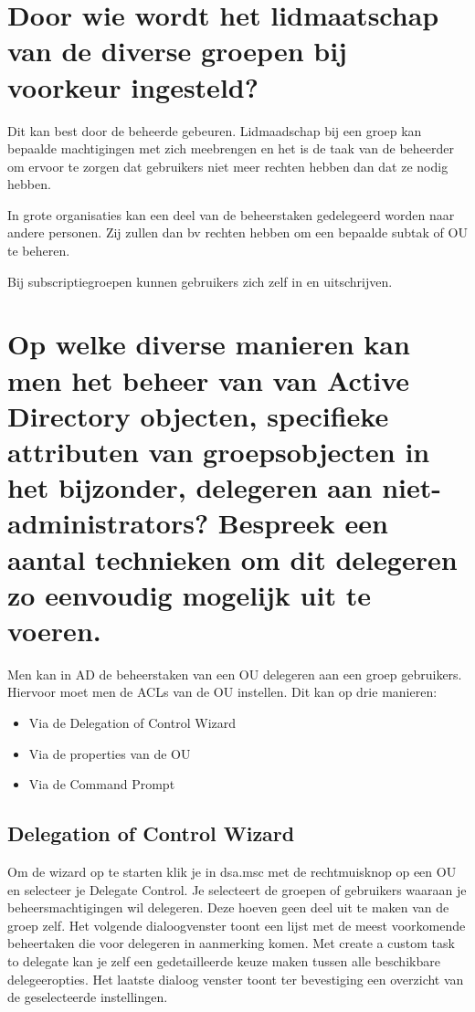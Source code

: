 \section{Door wie wordt het lidmaatschap van de diverse groepen bij voorkeur
ingesteld?}

Dit kan best door de beheerde gebeuren. Lidmaadschap bij een groep kan bepaalde
machtigingen met zich meebrengen en het is de taak van de beheerder om ervoor te
zorgen dat gebruikers niet meer rechten hebben dan dat ze nodig hebben.

In grote organisaties kan een deel van de beheerstaken gedelegeerd worden naar
andere personen. Zij zullen dan bv rechten hebben om een bepaalde subtak of OU
te beheren.

Bij subscriptiegroepen kunnen gebruikers zich zelf in en uitschrijven.

\section{Op welke diverse manieren kan men het beheer van van Active Directory
objecten, specifieke attributen van groepsobjecten in het bijzonder, delegeren
aan niet-administrators? Bespreek een aantal technieken om dit delegeren zo
eenvoudig mogelijk uit te voeren.}

Men kan in AD de beheerstaken van een OU delegeren aan een groep gebruikers.
Hiervoor moet men de ACLs van de OU instellen. Dit kan op drie manieren:
\begin{itemize}
	\item Via de Delegation of Control Wizard
	\item Via de properties van de OU
	\item Via de Command Prompt
\end{itemize}

\subsection{Delegation of Control Wizard}

Om de wizard op te starten klik je in dsa.msc met de rechtmuisknop op een OU en
selecteer je Delegate Control. Je selecteert de groepen of gebruikers waaraan je
beheersmachtigingen wil delegeren. Deze hoeven geen deel uit te maken van de
groep zelf. Het volgende dialoogvenster toont een lijst met de meest voorkomende
beheertaken die voor delegeren in aanmerking komen. Met create a custom task to
delegate kan je zelf een gedetailleerde keuze maken tussen alle beschikbare
delegeeropties. Het laatste dialoog venster toont ter bevestiging een overzicht
van de geselecteerde instellingen.

